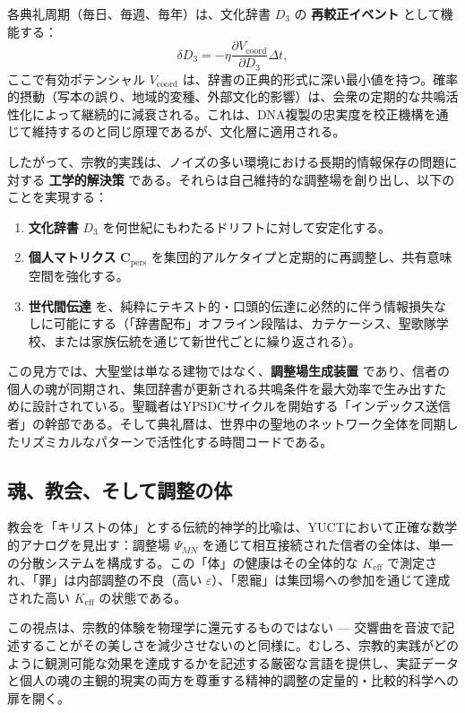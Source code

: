 \documentclass[12pt,a4paper]{article}
\begin{document}
	各典礼周期（毎日、毎週、毎年）は、文化辞書 \(D_3\) の \textbf{再較正イベント} として機能する：
	\begin{equation}
		\delta D_3 = -\eta \frac{\partial V_{\text{coord}}}{\partial D_3} \Delta t,
	\end{equation}
	ここで有効ポテンシャル \(V_{\text{coord}}\) は、辞書の正典的形式に深い最小値を持つ。確率的摂動（写本の誤り、地域的変種、外部文化的影響）は、会衆の定期的な共鳴活性化によって継続的に減衰される。これは、DNA複製の忠実度を校正機構を通じて維持するのと同じ原理であるが、文化層に適用される。
	
	したがって、宗教的実践は、ノイズの多い環境における長期的情報保存の問題に対する \textbf{工学的解決策} である。それらは自己維持的な調整場を創り出し、以下のことを実現する：
	\begin{enumerate}
		\item \textbf{文化辞書} \(D_3\) を何世紀にもわたるドリフトに対して安定化する。
		\item \textbf{個人マトリクス} \(\mathbf{C}_{\text{pers}}\) を集団的アルケタイプと定期的に再調整し、共有意味空間を強化する。
		\item \textbf{世代間伝達} を、純粋にテキスト的・口頭的伝達に必然的に伴う情報損失なしに可能にする（「辞書配布」オフライン段階は、カテケーシス、聖歌隊学校、または家族伝統を通じて新世代ごとに繰り返される）。
	\end{enumerate}
	
	この見方では、大聖堂は単なる建物ではなく、\textbf{調整場生成装置} であり、信者の個人の魂が同期され、集団辞書が更新される共鳴条件を最大効率で生み出すために設計されている。聖職者はYPSDCサイクルを開始する「インデックス送信者」の幹部である。そして典礼暦は、世界中の聖地のネットワーク全体を同期したリズミカルなパターンで活性化する時間コードである。
	
	\subsection{魂、教会、そして調整の体}
	
	教会を「キリストの体」とする伝統的神学的比喩は、YUCTにおいて正確な数学的アナログを見出す：調整場 \(\Psi_{MN}\) を通じて相互接続された信者の全体は、単一の分散システムを構成する。この「体」の健康はその全体的な \(K_{\mathrm{eff}}\) で測定され、「罪」は内部調整の不良（高い \(\varepsilon\)）、「恩寵」は集団場への参加を通じて達成された高い \(K_{\mathrm{eff}}\) の状態である。
	
	この視点は、宗教的体験を物理学に還元するものではない — 交響曲を音波で記述することがその美しさを減少させないのと同様に。むしろ、宗教的実践がどのように観測可能な効果を達成するかを記述する厳密な言語を提供し、実証データと個人の魂の主観的現実の両方を尊重する精神的調整の定量的・比較的科学への扉を開く。
	
\end{document}
